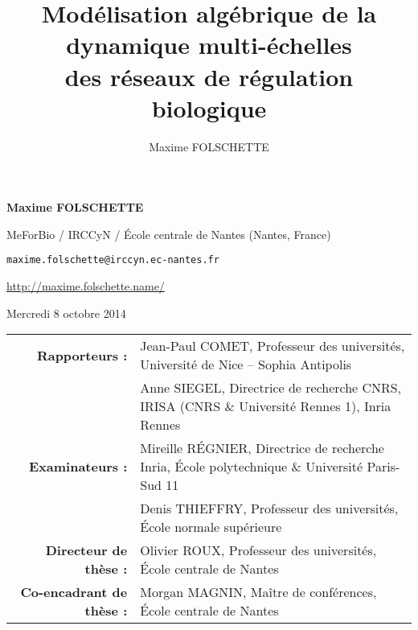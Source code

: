 \documentclass[fleqn,8pt,t]{beamer}
\date{\thedate}
\title[Modélisation algébrique de la dynamique multi-échelles des RRB]%
  {Modélisation algébrique de la dynamique multi-échelles\\des réseaux de régulation biologique}
\author{Maxime FOLSCHETTE}
\newcommand{\tval}[1]{\textbf{#1}}
\begin{document}
\begin{frame}[plain,label=title]

\begin{center}
\vfill
\textcolor{couleurtheme}{}

\par
\medskip
\bigskip
\normalsize
\tval{Maxime FOLSCHETTE}

\medskip
\footnotesize
MeForBio / IRCCyN / École centrale de Nantes (Nantes, France)

\texttt{maxime.folschette@irccyn.ec-nantes.fr}

\url{http://maxime.folschette.name/}

\bigskip

\normalsize
Mercredi 8 octobre 2014
\end{center}

\scriptsize
\bigskip


\begin{tabular}{r@{\ \ }l}
\textbf{Rapporteurs :}
& Jean-Paul COMET, Professeur des universités,
    Université de Nice -- Sophia Antipolis \\
& Anne SIEGEL, Directrice de recherche CNRS,
    IRISA (CNRS \& Université Rennes 1), Inria Rennes \vspace*{1em} \\
\textbf{Examinateurs :}
& Mireille RÉGNIER, Directrice de recherche Inria,
    École polytechnique \& Université Paris-Sud 11 \\
& Denis THIEFFRY, Professeur des universités,
    École normale supérieure \vspace*{1em} \\
\textbf{Directeur de thèse :}
& Olivier ROUX, Professeur des universités,
    École centrale de Nantes \\
\textbf{Co-encadrant de thèse :}
& Morgan MAGNIN, Maître de conférences,
    École centrale de Nantes
\end{tabular}

\vfill

\end{frame}
\end{document}
